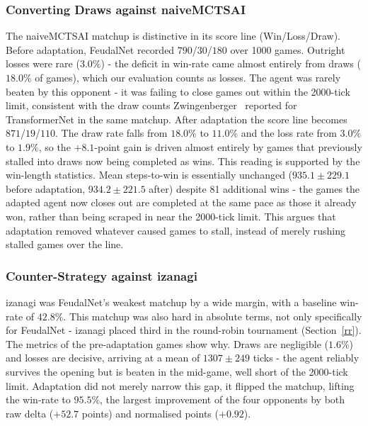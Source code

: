 \documentclass[sigconf,review=false]{acmart}
\begin{document}
\subsubsection{Converting Draws against naiveMCTSAI}
\label{naiveMCTSAI}
The naiveMCTSAI matchup is distinctive in its score line (Win/Loss/Draw). Before adaptation, FeudalNet recorded $790$/$30$/$180$ over 1000 games. 
Outright losses were rare ($3.0\%$) - the deficit in win-rate came almost entirely from draws ($18.0\%$ of games), which our evaluation counts as losses.
The agent was rarely beaten by this opponent - it was failing to close games out within the 2000-tick limit, consistent with the draw counts Zwingenberger~\cite{transformernet} reported for TransformerNet in the same matchup. 
After adaptation the score line becomes $871$/$19$/$110$. 
The draw rate falls from $18.0\%$ to $11.0\%$ and the loss rate from $3.0\%$ to $1.9\%$, so the $+8.1$-point gain is driven almost entirely by games that previously stalled into draws now being completed as wins.
This reading is supported by the win-length statistics. 
Mean steps-to-win is essentially unchanged ($935.1 \pm 229.1$ before adaptation, $934.2 \pm 221.5$ after) despite 81 additional wins - the games the adapted agent now closes out are completed at the same pace as those it already won, rather than being scraped in near the 2000-tick limit. 
This argues that adaptation removed whatever caused games to stall, instead of merely rushing stalled games over the line.

\subsubsection{Counter-Strategy against izanagi}
\label{izanagi-strat}
izanagi was FeudalNet's weakest matchup by a wide margin, with a baseline win-rate of $42.8\%$.
This matchup was also hard in absolute terms, not only specifically for FeudalNet - izanagi placed third in the round-robin tournament (Section~\ref{rr}).
The metrics of the pre-adaptation games show why. 
Draws are negligible ($1.6\%$) and losses are decisive, arriving at a mean of $1307 \pm 249$ ticks - the agent reliably survives the opening but is beaten in the mid-game, well short of the 2000-tick limit.
Adaptation did not merely narrow this gap, it flipped the matchup, lifting the win-rate to $95.5\%$, the largest improvement of the four opponents by both raw delta ($+52.7$ points) and normalised points ($+0.92$).
\end{document}
